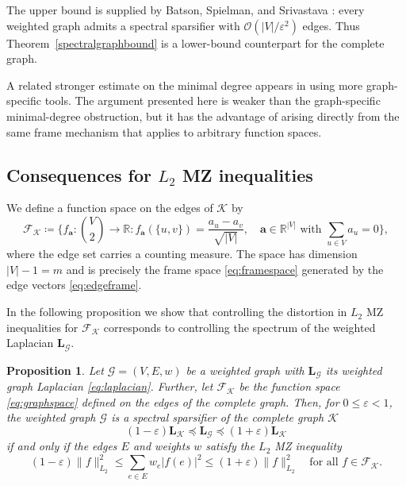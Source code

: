 \documentclass[a4paper]{amsart}
\numberwithin{equation}{section}
\newtheorem{proposition}[theorem]{Proposition}
\begin{document}
The upper bound is supplied by Batson, Spielman, and Srivastava \cite{BSS14}: every weighted graph admits a spectral sparsifier with $\mathcal O(|V|/\varepsilon^2)$ edges.
Thus Theorem~\ref{spectralgraphbound} is a lower-bound counterpart for the complete graph.

A related stronger estimate on the minimal degree appears in \cite[Proposition~4.2]{BSS14} using more graph-specific tools.
The argument presented here is weaker than the graph-specific minimal-degree obstruction, but it has the advantage of arising directly from the same frame mechanism that applies to arbitrary function spaces.



\subsection{Consequences for $L_2$ MZ inequalities}

We define a function space on the edges of $\mathcal K$ by
\begin{equation}\label{eq:graphspace}
    \mathcal F_{\mathcal K} \coloneqq \Big\{
        f_{\bm a} \colon {\textstyle\binom{V}{2}} \to\mathds R : f_{\bm a}(\{u,v\}) = \frac{a_u-a_v}{\sqrt{|V|}},\quad \bm a\in\mathds R^{|V|} \text{ with } \sum_{u\in V}a_u = 0
    \Big\} ,
\end{equation}
where the edge set carries a counting measure.
The space has dimension $|V|-1=m$ and is precisely the frame space \eqref{eq:framespace} generated by the edge vectors \eqref{eq:edgeframe}.

In the following proposition we show that controlling the distortion in $L_2$ MZ inequalities for $\mathcal F_{\mathcal K}$ corresponds to controlling the spectrum of the weighted Laplacian $\bm L_{\mathcal G}$.

\begin{proposition}\label{graphmz}
    Let $\mathcal G = (V,E,w)$ be a weighted graph with $\bm L_{\mathcal G}$ its weighted graph Laplacian \eqref{eq:laplacian}.
    Further, let $\mathcal F_{\mathcal K}$ be the function space \eqref{eq:graphspace} defined on the edges of the complete graph.
    Then, for $0\le \varepsilon <1$, the weighted graph $\mathcal G$ is a spectral sparsifier of the complete graph $\mathcal K$
    \begin{equation*}
        (1-\varepsilon)\bm L_{\mathcal K} \preceq \bm L_{\mathcal G} \preceq (1+\varepsilon)\bm L_{\mathcal K}
    \end{equation*}
    if and only if the edges $E$ and weights $w$ satisfy the $L_2$ MZ inequality
    \begin{equation*}
        (1-\varepsilon)\|f\|_{L_2}^{2}
        \le \sum_{e\in E} w_e |f(e)|^2
        \le (1+\varepsilon)\|f\|_{L_2}^{2}
        \quad\text{for all }f\in \mathcal F_{\mathcal K}.
    \end{equation*}
\end{proposition}
\end{document}
